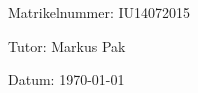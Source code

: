 \begin{large} 
\begin{center}
Matrikelnummer: IU14072015
\end{center}
\end{large} 

\vspace*{-6mm}

\begin{large} 
\begin{center}
Tutor: Markus Pak
\end{center}
\end{large} 

\vspace*{-6mm}

\begin{large} 
\begin{center}
Datum: \today
\end{center}
\end{large} 


\pagestyle{empty} %

